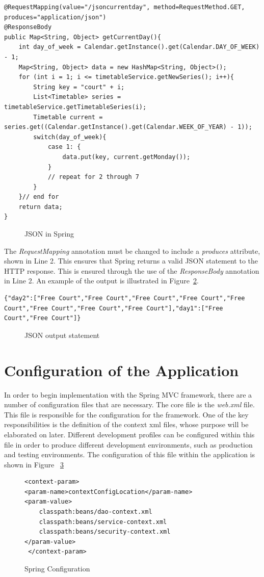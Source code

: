 \begin{lstlisting}
@RequestMapping(value="/jsoncurrentday", method=RequestMethod.GET, produces="application/json")
@ResponseBody
public Map<String, Object> getCurrentDay(){
	int day_of_week = Calendar.getInstance().get(Calendar.DAY_OF_WEEK) - 1;
	Map<String, Object> data = new HashMap<String, Object>();
	for (int i = 1; i <= timetableService.getNewSeries(); i++){
		String key = "court" + i;
		List<Timetable> series = timetableService.getTimetableSeries(i);
		Timetable current = series.get((Calendar.getInstance().get(Calendar.WEEK_OF_YEAR) - 1));
		switch(day_of_week){
			case 1: {
				data.put(key, current.getMonday());
			}
			// repeat for 2 through 7
		}
	}// end for
	return data;
}
\end{lstlisting}
\begin{figure}[H]
\caption{JSON in Spring}
\label{fig:json}
\end{figure}

The \textit{RequestMapping} annotation must be changed to include a \textit{produces} attribute, shown in Line 2. This ensures that Spring returns a valid JSON statement to the HTTP response. This is ensured through the use of the \textit{ResponseBody} annotation in Line 2.  An example of the output is illustrated in Figure~\ref{fig:jsonex}.

\begin{lstlisting}
{"day2":["Free Court","Free Court","Free Court","Free Court","Free Court","Free Court","Free Court","Free Court"],"day1":["Free Court","Free Court"]}
\end{lstlisting}
\begin{figure}[H]
\caption{JSON output statement}
\label{fig:jsonex}
\end{figure}



\section{Configuration of the Application}

In order to begin implementation with the Spring MVC framework, there are a number of configuration files that are necessary. The core file is the \textit{web.xml} file. This file is responsible for the configuration for the framework. One of the key responsibilities is the definition of the context xml files, whose purpose will be elaborated on later. Different development profiles can be configured within this file in order to produce different development environments, such as production and testing environments. The configuration of this file within the application is shown in Figure ~\ref{fig:springConfig} \newline 
\begin{figure}[H]
\begin{lstlisting}
<context-param>
<param-name>contextConfigLocation</param-name>
<param-value>
	classpath:beans/dao-context.xml
	classpath:beans/service-context.xml
	classpath:beans/security-context.xml
</param-value>
 </context-param>
\end{lstlisting}
\caption{Spring Configuration}
\label{fig:springConfig}
\end{figure}

